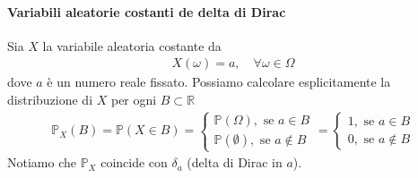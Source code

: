 \documentclass[a4paper,12pt]{article}
\begin{document}
\paragraph{Variabili aleatorie costanti de delta di Dirac} Sia $X$ la variabile aleatoria costante da 
\begin{align*}
  X(\omega) = a, \quad \forall \omega \in \Omega
\end{align*}
dove $a$ è un numero reale fissato. Possiamo calcolare esplicitamente la distribuzione di $X$ per ogni $B \subset \mathbb{R}$
\begin{align*}
  \mathbb{P}_X(B) = \mathbb{P}(X \in B) = \begin{cases}
    \mathbb{P}(\Omega), \text{ se $a \in B$}\\
    \mathbb{P}(\emptyset), \text{ se $a \notin B$}
  \end{cases} = \begin{cases}
    1, \text{ se $a \in B$}\\
    0, \text{ se $a \notin B$}
  \end{cases}
\end{align*}
Notiamo che $\mathbb{P}_X$ coincide con $\delta_a$ (delta di Dirac in $a$).\\
\end{document}
